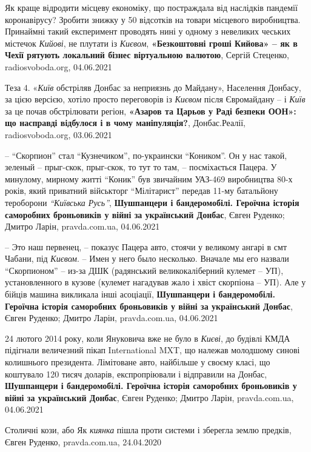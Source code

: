 Як краще відродити місцеву економіку, що постраждала від наслідків пандемії
коронавірусу? Зробити знижку у 50 відсотків на товари місцевого виробництва.
Принаймні такий експеримент проводять нині у одному з невеликих чеських
містечок \emph{Кийові}, не плутати із \emph{Києвом},
\textbf{«Безкоштовні гроші Кийова» – як в Чехії рятують локальний бізнес віртуальною валютою},
Сергій Стеценко, radiosvoboda.org, 04.06.2021

Теза 4. «\emph{Київ} обстріляв Донбас за неприязнь до Майдану», Населення
Донбасу, за цією версією, хотіло просто переговорів із \emph{Києвом} після Євромайдану
– і \emph{Київ} за це почав обстрілювати регіон,
\textbf{«Азаров та Царьов у Раді безпеки ООН»: що насправді відбулося і в чому маніпуляція?},
Донбас.Реалії, radiosvoboda.org, 03.06.2021

– \enquote{Скорпион} стал \enquote{Кузнечиком}, по-украински \enquote{Коником}. Он у нас такой, зеленый
– прыг-скок, прыг-скок, то тут то там, – посміхається Пацера.  У минулому,
мирному житті \enquote{Коник} був звичайним УАЗ-469 виробництва 80-х років, який
приватний військторг \enquote{Мілітарист} передав 11-му батальйону тероборони \emph{\enquote{Київська
Русь}},
\textbf{Шушпанцери і бандеромобілі. Героїчна історія саморобних броньовиків у війні за український Донбас},
Євген Руденко; Дмитро Ларін, pravda.com.ua, 04.06.2021

– Это наш первенец, – показує Пацера авто, стоячи у великому ангарі в смт
Чабани, під \emph{Києвом}. – Имен у него было несколько. Вначале мы его назвали
\enquote{Скорпионом} – из-за ДШК (радянський великокаліберний кулемет – УП),
установленного в кузове (кулемет нагадував жало і хвіст скорпіона – УП).  Але у
бійців машина викликала інші асоціації,
\textbf{Шушпанцери і бандеромобілі. Героїчна історія саморобних броньовиків у війні за український Донбас},
Євген Руденко; Дмитро Ларін, pravda.com.ua, 04.06.2021

24 лютого 2014 року, коли Януковича вже не було в \emph{Києві}, до будівлі КМДА
підігнали величезний пікап International MXT, що належав молодшому синові
колишнього президента.  Лімітоване авто, найбільше у своєму класі, що коштувало
120 тисяч доларів, експропріювали і відправили на Донбас,
\textbf{Шушпанцери і бандеромобілі. Героїчна історія саморобних броньовиків у війні за український Донбас},
Євген Руденко; Дмитро Ларін, pravda.com.ua, 04.06.2021

Столичні кози, або Як \emph{киянка} пішла проти системи і зберегла землю предків,
Євген Руденко, pravda.com.ua, 24.04.2020

